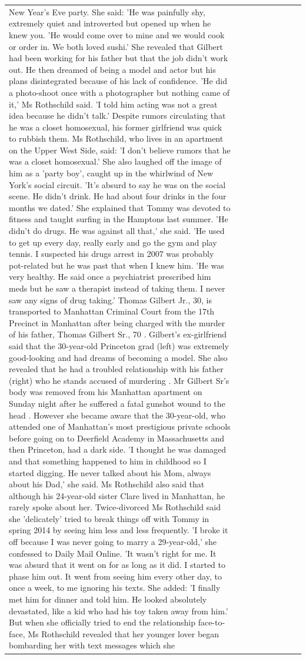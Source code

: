 \begin{table}[H]
\begin{tabular}{lllrlllll}
New Year’s Eve party. She said: 'He was painfully shy, extremely quiet and introverted but opened up when he knew you. 'He would come over to mine and we would cook or order in. We both loved sushi.' She revealed that Gilbert had been working for his father but that the job didn't work out. He then dreamed of being a model and actor but his plans disintegrated because of his lack of confidence. 'He did a photo-shoot once with a photographer but nothing came of it,' Ms Rothschild said. 'I told him acting was not a great idea because he didn’t talk.' Despite rumors circulating that he was a closet homosexual, his former girlfriend was quick to rubbish them. Ms Rothschild, who lives in an apartment on the Upper West Side, said: 'I don’t believe rumors that he was a closet homosexual.' She also laughed off the image of him as a 'party boy', caught up in the whirlwind of New York's social circuit. 'It’s absurd to say he was on the social scene. He didn’t drink. He had about four drinks in the four months we dated.' She explained that Tommy was devoted to fitness and taught surfing in the Hamptons last summer. 'He didn’t do drugs. He was against all that,' she said. 'He used to get up every day, really early and go the gym and play tennis. I suspected his drugs arrest in 2007 was probably pot-related but he was past that when I knew him. 'He was very healthy. He said once a psychiatrist prescribed him meds but he saw a therapist instead of taking them. I never saw any signs of drug taking.' Thomas Gilbert Jr., 30, is transported to Manhattan Criminal Court from the 17th Precinct in Manhattan after being charged with the murder of his father, Thomas Gilbert Sr., 70 . Gilbert's ex-girlfriend said that the 30-year-old Princeton grad (left) was extremely good-looking and had dreams of becoming a model. She also revealed that he had a troubled relationship with his father (right) who he stands accused of murdering . Mr Gilbert Sr's body was removed from his Manhattan apartment on Sunday night after he suffered a fatal gunshot wound to the head . However she became aware that the 30-year-old, who attended one of Manhattan's most prestigious private schools before going on to Deerfield Academy in Massachusetts and then Princeton, had a dark side. 'I thought he was damaged and that something happened to him in childhood so I started digging. He never talked about his Mom, always about his Dad,' she said. Ms Rothschild also said that although his 24-year-old sister Clare lived in Manhattan, he rarely spoke about her. Twice-divorced Ms Rothschild said she 'delicately' tried to break things off with Tommy in spring 2014 by seeing him less and less frequently. 'I broke it off because I was never going to marry a 29-year-old,' she confessed to Daily Mail Online. 'It wasn’t right for me. It was absurd that it went on for as long as it did. I started to phase him out. It went from seeing him every other day, to once a week, to me ignoring his texts. She added: 'I finally met him for dinner and told him. He looked absolutely devastated, like a kid who had his toy taken away from him.' But when she officially tried to end the relationship face-to-face, Ms Rothschild revealed that her younger lover began bombarding her with text messages which she 
\end{tabular}
\end{table}
